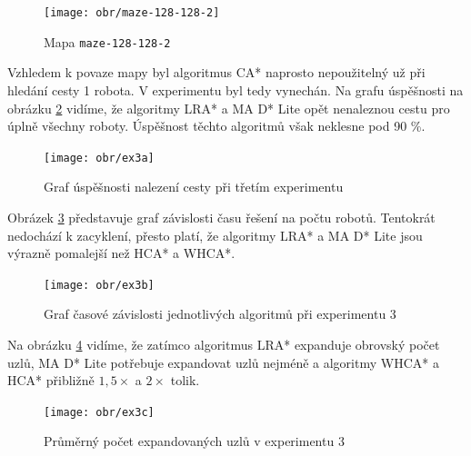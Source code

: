 \begin{figure}[htb]
	\begin{center}
		\texttt{[image: obr/maze-128-128-2]}
	\end{center}
	\caption[caption]{Mapa \texttt{maze-128-128-2}  \cite{Sturtevant2012}}
	\label{obr:maze-128-128-2}
\end{figure}


Vzhledem k povaze mapy byl algoritmus CA* naprosto nepoužitelný už při hledání cesty 1 robota. V experimentu byl tedy vynechán. Na grafu úspěšnosti na obrázku \ref{obr:ex3a} vidíme, že algoritmy LRA* a MA D* Lite opět nenaleznou cestu pro úplně všechny roboty. Úspěšnost těchto algoritmů však neklesne pod 90 \%.

\vspace*{-10mm}
\begin{figure}[H]
	\begin{center}
		\texttt{[image: obr/ex3a]}
	\end{center}
	\vspace*{-10mm}
	\caption[caption]{Graf úspěšnosti nalezení cesty při třetím experimentu}
	\label{obr:ex3a}
\end{figure}

Obrázek \ref{obr:ex3b} představuje graf závislosti času řešení na počtu robotů. Tentokrát nedochází k zacyklení, přesto platí, že algoritmy LRA* a MA D* Lite jsou výrazně pomalejší než HCA* a WHCA*.

\vspace*{-10mm}
\begin{figure}[H]
	\begin{center}
		\texttt{[image: obr/ex3b]}
	\end{center}
	\vspace*{-10mm}
	\caption[caption]{Graf časové závislosti jednotlivých algoritmů při experimentu 3}
	\label{obr:ex3b}
\end{figure}

Na obrázku \ref{obr:ex3c} vidíme, že zatímco algoritmus LRA* expanduje obrovský počet uzlů, MA D* Lite potřebuje expandovat uzlů nejméně a algoritmy WHCA* a HCA* přibližně $1{,}5×$ a $2×$ tolik.

\vspace*{-10mm}
\begin{figure}[H]
	\begin{center}
		\texttt{[image: obr/ex3c]}
	\end{center}
	\vspace*{-10mm}
	\caption[caption]{Průměrný počet expandovaných uzlů v experimentu 3}
	\label{obr:ex3c}
\end{figure}

